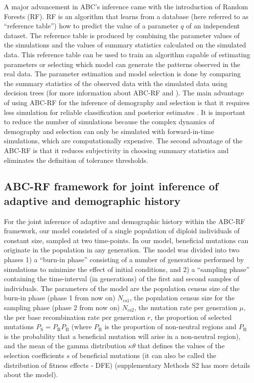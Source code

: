 \documentclass[a4paper, 12pt]{article}
\begin{document}
A major advancement in ABC's inference came with the introduction of Random Forests (RF)\citep{Pudlo:2016il,Raynal:2017wm}. RF is an algorithm that learns from a database (here referred to as ``reference table'') how to predict the value of a parameter $q$ of an independent dataset. The reference table is produced by combining the parameter values of the simulations and the values of summary statistics calculated on the simulated data. This reference table can be used to train an algorithm capable of estimating parameters or selecting which model can generate the patterns observed in the real data. The parameter estimation and model selection is done by comparing the summary statistics of the observed data with the simulated data using decision trees (for more information about ABC-RF \citet{Pudlo:2016il} and \citet{Raynal:2017wm}). The main advantage of using ABC-RF for the inference of demography and selection is that it requires less simulation for reliable classification \citep{Pudlo:2016il, Fraimout:2017jq} and posterior estimates \citep{Raynal:2017wm}. It is important to reduce the number of simulations because the complex dynamics of demography and selection can only be simulated with forward-in-time simulations, which are computationally expensive. The second advantage of the ABC-RF is that it reduces subjectivity in choosing summary statistics and eliminates the definition of tolerance thresholds.

\subsection*{ABC-RF framework for joint inference of adaptive and demographic history}

For the joint inference of adaptive and demographic history within the ABC-RF framework, our model consisted of a single population of diploid individuals of constant size, sampled at two time-points. In our model, beneficial mutations can originate in the population in any generation. The model was divided into two phases 1) a ``burn-in phase'' consisting of a number of generations performed by simulations to minimize the effect of initial conditions, and 2) a ``sampling phase'' containing the time-interval (in generations) of the first and second samples of individuals. The parameters of the model are the population census size of the burn-in phase (phase 1 from now on) $N_{\mathrm{cs}1}$, the population census size for the sampling phase (phase 2 from now on) $N_{\mathrm{cs}2}$, the mutation rate per generation $\mu$, the per base recombination rate per generation $r$, the proportion of selected mutations $P_{\mathrm{S}} = P_{\mathrm{R}}P_{\mathrm{B}}$ (where $P_{\mathrm{R}}$ is the proportion of non-neutral regions and $P_{\mathrm{B}}$ is the probability that a beneficial mutation will arise in a non-neutral region), and the mean of the gamma distribution $\kappa\theta$ that defines the values of the selection coefficients $s$ of beneficial mutations (it can also be called the distribution of fitness effects - DFE) (supplementary Methods S2 has more details about the model).
\end{document}
